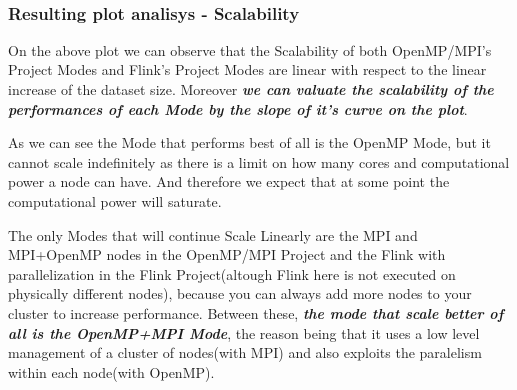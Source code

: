 \documentclass[11pt]{article}
\begin{document}
    \begin{center}
    \end{center}
    { \hspace*{\fill} \\}
    
    \hypertarget{resulting-plot-analisys---scalability}{%
\subsubsection{Resulting plot analisys -
Scalability}\label{resulting-plot-analisys---scalability}}

On the above plot we can observe that the Scalability of both
OpenMP/MPI's Project Modes and Flink's Project Modes are linear with
respect to the linear increase of the dataset size. Moreover
\textbf{\emph{we can valuate the scalability of the performances of each
Mode by the slope of it's curve on the plot}}.

As we can see the Mode that performs best of all is the OpenMP Mode, but
it cannot scale indefinitely as there is a limit on how many cores and
computational power a node can have. And therefore we expect that at
some point the computational power will saturate.

The only Modes that will continue Scale Linearly are the MPI and
MPI+OpenMP nodes in the OpenMP/MPI Project and the Flink with
parallelization in the Flink Project(altough Flink here is not executed
on physically different nodes), because you can always add more nodes to
your cluster to increase performance. Between these, \textbf{\emph{the
mode that scale better of all is the OpenMP+MPI Mode}}, the reason being
that it uses a low level management of a cluster of nodes(with MPI) and
also exploits the paralelism within each node(with OpenMP).


    
    
    
    
\end{document}
